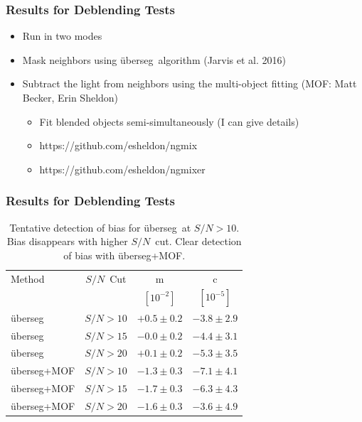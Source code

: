\documentclass{beamer}
\newcommand{\snr}{$S/N$}
\newcommand{\uberseg}{{\"u}berseg}
\begin{document}
\frame
{

    \frametitle{Results for Deblending Tests}


    \begin{itemize}

        \item Run in two modes
        \item Mask neighbors using \uberseg\ algorithm (Jarvis et al. 2016)
        \item Subtract the light from neighbors using the multi-object
            fitting (MOF: Matt Becker, Erin Sheldon)
            \begin{itemize}
                \item Fit blended objects semi-simultaneously (I can give details)
                \item https://github.com/esheldon/ngmix
                \item https://github.com/esheldon/ngmixer
            \end{itemize}


    \end{itemize}


}

\frame
{

    \frametitle{Results for Deblending Tests}

\begin{table}
    \centering
    \begin{tabular}{|l|c|c|c|}
        \hline
        Method         & \snr\ Cut & m            & c            \\
                       &           & $[10^{-2}]$  & $[10^{-5}]$  \\
        \hline

		\hline
        \uberseg       & \snr$ > 10$ & $+0.5 \pm 0.2$  & $-3.8 \pm 2.9$ \\
        \uberseg       & \snr$ > 15$ & $-0.0 \pm 0.2$  & $-4.4 \pm 3.1$ \\
        \uberseg       & \snr$ > 20$ & $+0.1 \pm 0.2$  & $-5.3 \pm 3.5$ \\

        \hline
        \uberseg+MOF   & \snr$ > 10$ & $-1.3 \pm 0.3$ & $-7.1 \pm 4.1$ \\
        \uberseg+MOF   & \snr$ > 15$ & $-1.7 \pm 0.3$ & $-6.3 \pm 4.3$ \\
        \uberseg+MOF   & \snr$ > 20$ & $-1.6 \pm 0.3$ & $-3.6 \pm 4.9$ \\


		\hline
    \end{tabular}
    \caption{Tentative detection of bias for \uberseg\ at \snr$>10$.
    Bias disappears with higher \snr\ cut.
    Clear detection of bias with \uberseg+MOF.
     \label{tab:mcal:deblending}}
\end{table}


}
\end{document}
